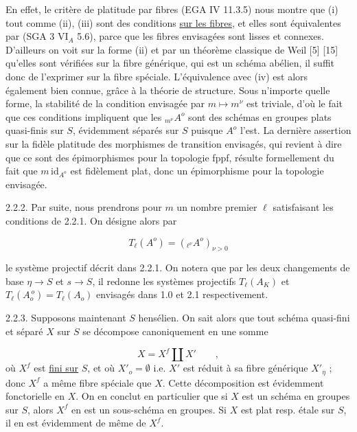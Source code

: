 En effet, le critère de platitude par fibres (EGA IV 11.3.5) nous montre que (i) tout comme (ii), (iii) sont des conditions \underline{sur les fibres}, et elles sont équivalentes par (SGA 3 $\mathrm{VI}_A$ 5.6), parce que les fibres envisagées sont lisses et connexes. D'ailleurs on voit sur la forme (ii) et par un théorème classique de Weil [5] [15] qu'elles sont vérifiées sur la fibre générique, qui est un schéma abélien, il suffit donc de l'exprimer sur la fibre spéciale. L'équivalence avec (iv) est alors également bien connue, grâce à la théorie de structure. Sous n'importe quelle forme, la stabilité de la condition envisagée par $m \longmapsto m^\nu$ est triviale, d'où le fait que ces conditions impliquent que les ${}_{m^\nu}A^o$ sont des schémas en groupes plats quasi-finis sur $S$, évidemment séparés sur $S$ puisque $A^o$ l'est. La dernière assertion sur la fidèle platitude des morphismes de transition envisagés, qui revient à dire que ce sont des épimorphismes pour la topologie fppf, résulte formellement du fait que $m \,\mathrm{id}_{A^o}$ est fidèlement plat, donc un épimorphisme pour la topologie envisagée.

2.2.2.  Par suite, nous prendrons pour $m$ un nombre premier $\ell$ satisfaisant les conditions de 2.2.1. On désigne alors par

\begin{equation}\tag{2.2.2.1}
T_\ell(A^o) = ({}_{\ell^\nu}A^o)_{\nu > 0}
\end{equation}



le système projectif décrit dans 2.2.1. On notera que par les deux changements de base $\eta \longrightarrow S$ et $s \longrightarrow S$, il redonne les systèmes projectifs $T_{\ell}(A_{K})$ et $T_{\ell}(A_{o}^{\,o}) = T_{\ell}(A_{o})$ envisagés dans 1.0 et 2.1 respectivement.

2.2.3. Supposons maintenant $S$ hensélien. On sait alors que tout schéma quasi-fini et séparé $X$ sur $S$ se décompose canoniquement en une somme

\begin{equation}\tag{2.2.3.1}
X = X^{f} \coprod X' \qquad ,
\end{equation}
où $X^{f}$ est \underline{fini sur} $S$, et où $X'_{o} = \emptyset$ i.e. $X'$ est réduit à sa fibre générique $X'_{\eta}$ ; donc $X^{f}$ a même fibre spéciale que $X$. Cette décomposition est évidemment fonctorielle en $X$. On en conclut en particulier que si $X$ est un schéma en groupes sur $S$, alors $X^{f}$ en est un sous-schéma en groupes. Si $X$ est plat resp. étale sur $S$, il en est évidemment de même de $X^{f}$.

